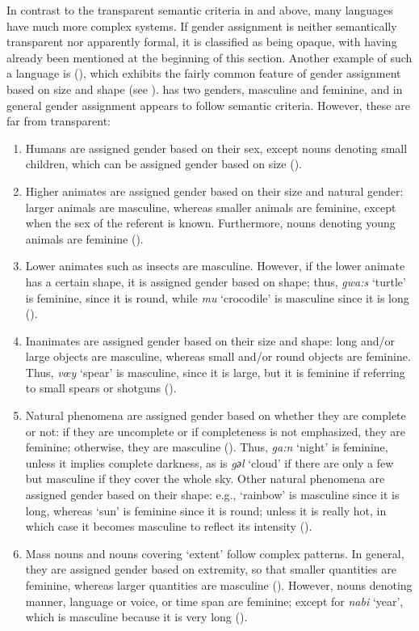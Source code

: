 \documentclass[output=collectionpaper]{langsci/langscibook}
\begin{document}
In contrast to the transparent semantic criteria in  and   above, many languages have much more complex systems. If gender assignment is neither semantically transparent nor apparently formal, it is classified as being opaque, with  having already been mentioned at the beginning of this section. Another example of such a language is  (), which exhibits the fairly common feature of gender assignment based on size and shape (see ).  has two genders, masculine and feminine, and in general gender assignment appears to follow semantic criteria. However, these are far from transparent:

\begin{enumerate}
\item Humans are assigned gender based on their sex, except nouns denoting small children, which can be assigned gender based on size (\citealt[116--117]{Aikhenvald2008}).
\item Higher animates are assigned gender based on their size and natural gender: larger animals are masculine, whereas smaller animals are feminine, except when the sex of the referent is known. Furthermore, nouns denoting young animals are feminine (\citealt[117]{Aikhenvald2008}).
\item Lower animates such as insects are masculine. However, if the lower animate has a certain shape, it is assigned gender based on shape; thus, \textit{gwa:s} `turtle' is feminine, since it is round, while \textit{mu} `crocodile' is masculine since it is long (\citealt[117]{Aikhenvald2008}).
\item Inanimates are assigned gender based on their size and shape: long and/or large objects are masculine, whereas small and/or round objects are feminine. Thus, \textit{vœy} `spear' is masculine, since it is large, but it is feminine if referring to small spears or shotguns (\citealt[117]{Aikhenvald2008}).
\item Natural phenomena are assigned gender based on whether they are complete or not: if they are uncomplete or if completeness is not emphasized, they are feminine; otherwise, they are masculine (\citealt[118]{Aikhenvald2008}). Thus, \textit{ga:n} `night' is feminine, unless it implies complete darkness, as is \textit{gәl} `cloud' if there are only a few but masculine if they cover the whole sky. Other natural phenomena are assigned gender based on their shape: e.g., `rainbow' is masculine since it is long, whereas `sun' is feminine since it is round; unless it is really hot, in which case it becomes masculine to reflect its intensity (\citealt[119]{Aikhenvald2008}).
\item Mass nouns and nouns covering `extent' follow complex patterns. In general, they are assigned gender based on extremity, so that smaller quantities are feminine, whereas larger quantities are masculine (\citealt[119--120]{Aikhenvald2008}). However, nouns denoting manner, language or voice, or time span are feminine; except for \textit{nabi} `year', which is masculine because it is very long (\citealt[119]{Aikhenvald2008}).
\end{enumerate}
\end{document}
